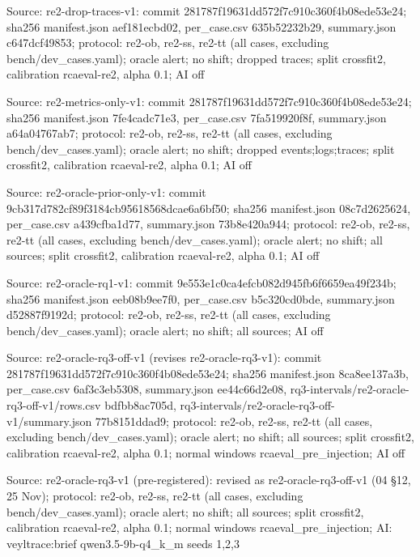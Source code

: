 \noindent Source: re2-drop-traces-v1: commit 281787f19631dd572f7c910c360f4b08ede53e24; sha256 manifest.json aef181ecbd02, per\_case.csv 635b52232b29, summary.json c647dcf49853; protocol: re2-ob, re2-ss, re2-tt (all cases, excluding bench/\allowbreak{}dev\_cases.yaml); oracle alert; no shift; dropped traces; split crossfit2, calibration rcaeval-re2, alpha 0.1; AI off\par
\noindent Source: re2-metrics-only-v1: commit 281787f19631dd572f7c910c360f4b08ede53e24; sha256 manifest.json 7fe4cadc71e3, per\_case.csv 7fa519920f8f, summary.json a64a04767ab7; protocol: re2-ob, re2-ss, re2-tt (all cases, excluding bench/\allowbreak{}dev\_cases.yaml); oracle alert; no shift; dropped events;logs;traces; split crossfit2, calibration rcaeval-re2, alpha 0.1; AI off\par
\noindent Source: re2-oracle-prior-only-v1: commit 9cb317d782cf89f3184cb95618568dcae6a6bf50; sha256 manifest.json 08c7d2625624, per\_case.csv a439cfba1d77, summary.json 73b8e420a944; protocol: re2-ob, re2-ss, re2-tt (all cases, excluding bench/\allowbreak{}dev\_cases.yaml); oracle alert; no shift; all sources; split crossfit2, calibration rcaeval-re2, alpha 0.1; AI off\par
\noindent Source: re2-oracle-rq1-v1: commit 9e553e1c0ca4efcb082d945fb6f6659ea49f234b; sha256 manifest.json eeb08b9ee7f0, per\_case.csv b5c320cd0bde, summary.json d52887f9192d; protocol: re2-ob, re2-ss, re2-tt (all cases, excluding bench/\allowbreak{}dev\_cases.yaml); oracle alert; no shift; all sources; AI off\par
\noindent Source: re2-oracle-rq3-off-v1 (revises re2-oracle-rq3-v1): commit 281787f19631dd572f7c910c360f4b08ede53e24; sha256 manifest.json 8ca8ee137a3b, per\_case.csv 6af3c3eb5308, summary.json ee44c66d2e08, rq3-intervals/\allowbreak{}re2-oracle-rq3-off-v1/\allowbreak{}rows.csv bdfbb8ac705d, rq3-intervals/\allowbreak{}re2-oracle-rq3-off-v1/\allowbreak{}summary.json 77b8151ddad9; protocol: re2-ob, re2-ss, re2-tt (all cases, excluding bench/\allowbreak{}dev\_cases.yaml); oracle alert; no shift; all sources; split crossfit2, calibration rcaeval-re2, alpha 0.1; normal windows rcaeval\_pre\_injection; AI off\par
\noindent Source: re2-oracle-rq3-v1 (pre-registered): revised as re2-oracle-rq3-off-v1 (04 \S{}12, 25 Nov); protocol: re2-ob, re2-ss, re2-tt (all cases, excluding bench/\allowbreak{}dev\_cases.yaml); oracle alert; no shift; all sources; split crossfit2, calibration rcaeval-re2, alpha 0.1; normal windows rcaeval\_pre\_injection; AI: veyltrace:brief qwen3.5-9b-q4\_k\_m seeds 1,2,3\par
